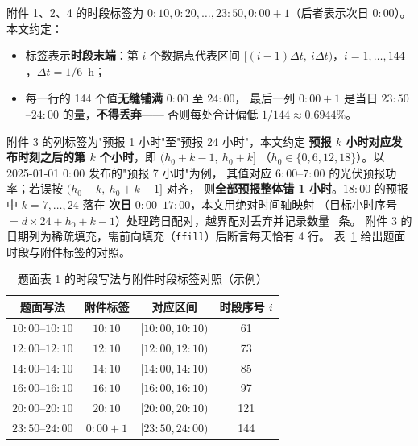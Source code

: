 附件 1、2、4 的时段标签为 \(0{:}10,0{:}20,\dots,23{:}50,0{:}00{+}1\)（后者表示次日
\(0{:}00\)）。本文约定：

\begin{itemize}
  \item 标签表示\textbf{时段末端}：第 \(i\) 个数据点代表区间
        \([(i-1)\Delta t,\ i\Delta t)\)，\(i=1,\dots,144\)，\(\Delta t=1/6\)~h；
  \item 每一行的 144 个值\textbf{无缝铺满} \(0{:}00\) 至 \(24{:}00\)，
        最后一列 \(0{:}00{+}1\) 是当日 \(23{:}50\)--\(24{:}00\) 的量，\textbf{不得丢弃}——
        否则每处合计偏低 \(1/144\approx 0.6944\%\)。
\end{itemize}

附件 3 的列标签为"预报 1 小时"至"预报 24 小时"，本文约定
\textbf{预报 \(k\) 小时对应发布时刻之后的第 \(k\) 个小时}，即 \((h_0+k-1,\ h_0+k]\)
（\(h_0\in\{0,6,12,18\}\)）。以 2025-01-01 \(0{:}00\) 发布的"预报 7 小时"为例，
其值对应 \(6{:}00\)--\(7{:}00\) 的光伏预报功率；若误按 \((h_0+k,\ h_0+k+1]\) 对齐，
则\textbf{全部预报整体错 1 小时}。\(18{:}00\) 的预报中 \(k=7,\dots,24\) 落在
\textbf{次日} \(0{:}00\)--\(17{:}00\)，本文用绝对时间轴映射
（目标小时序号 \(=d\times24+h_0+k-1\)）处理跨日配对，越界配对丢弃并记录数量 \ph~条。
附件 3 的日期列为稀疏填充，需前向填充（\texttt{ffill}）后断言每天恰有 4 行。
表~\ref{tab:timeruler} 给出题面时段与附件标签的对照。

\begin{table}[htbp]
  \centering
  \caption{题面表 1 的时段写法与附件时段标签对照（示例）}
  \label{tab:timeruler}
  \small
  \begin{tabular}{cccc}
    \toprule
    题面写法 & 附件标签 & 对应区间 & 时段序号 \(i\) \\
    \midrule
    \(10{:}00\)--\(10{:}10\) & \(10{:}10\) & \([10{:}00,10{:}10)\) & 61 \\
    \(12{:}00\)--\(12{:}10\) & \(12{:}10\) & \([12{:}00,12{:}10)\) & 73 \\
    \(14{:}00\)--\(14{:}10\) & \(14{:}10\) & \([14{:}00,14{:}10)\) & 85 \\
    \(16{:}00\)--\(16{:}10\) & \(16{:}10\) & \([16{:}00,16{:}10)\) & 97 \\
    \(20{:}00\)--\(20{:}10\) & \(20{:}10\) & \([20{:}00,20{:}10)\) & 121 \\
    \(23{:}50\)--\(24{:}00\) & \(0{:}00{+}1\) & \([23{:}50,24{:}00)\) & 144 \\
    \bottomrule
  \end{tabular}
\end{table}

